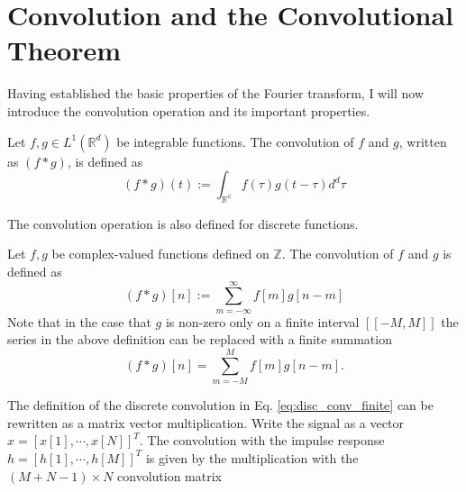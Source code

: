 \section{Convolution and the Convolutional Theorem}\label{sec:conv}

Having established the basic properties of the Fourier transform, I will now introduce the convolution operation and its important properties.

\begin{definition}[Convolution]
    Let $f, g \in L^1(\mathbb{R}^d)$ be integrable functions. The convolution of $f$ and $g$, written as $(f \ast g)$, is defined as
    \begin{equation}
        (f \ast g)(t) := \int_{\mathbb{R^d}} f(\tau) g(t - \tau) d^d \tau
    \end{equation}
    \label{eq:conv_def}
\end{definition}
The convolution operation is also defined for discrete functions.

\begin{definition}
    Let $f, g$ be complex-valued functions defined on $\mathbb{Z}$. The convolution of $f$ and $g$ is defined as
    \begin{equation}
        (f \ast g)[n] := \sum_{m=-\infty}^{\infty} f[m] g[n - m]
        \label{eq:disc_conv}
    \end{equation}
    Note that in the case that $g$ is non-zero only on a finite interval $[\![-M, M]\!]$ the series in the above definition can be replaced with a finite summation 
    \begin{equation}
        (f \ast g)[n] = \sum_{m=-M}^{M} f[m] g[n - m].
        \label{eq:disc_conv_finite}
    \end{equation}
\end{definition}

The definition of the discrete convolution in Eq. \ref{eq:disc_conv_finite} can be rewritten as a matrix vector multiplication. Write the signal as a vector
$x = [ x[1], \cdots, x[N] ]^{T}$. The convolution with the impulse response $h = [h[1], \cdots, h[M]]^T$ is given by the multiplication with the 
$(M+N-1) \times N$ convolution matrix

